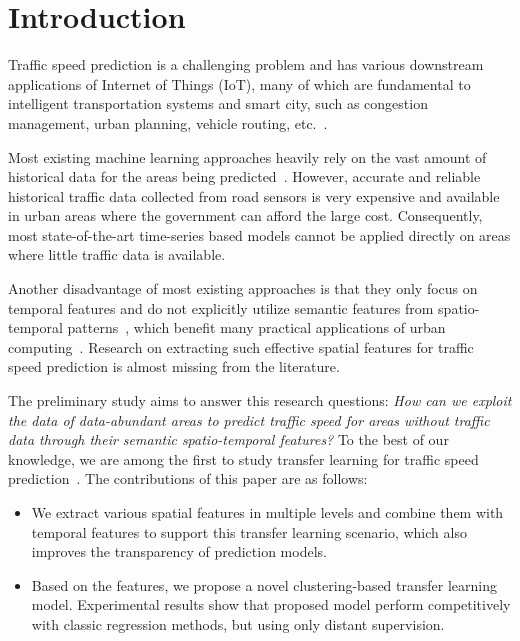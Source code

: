 \section{Introduction}
Traffic speed prediction is a challenging problem and has various downstream applications of Internet of Things (IoT), many of which are fundamental to intelligent transportation systems and smart city, such as
congestion management, urban planning, vehicle routing, etc.~\cite{Pan2012,Xu2015,Mchugh2015}.

Most existing machine learning approaches heavily rely on the vast amount of historical data for the areas being predicted~\cite{Ren2014,Clark2003Traffic}.
However, accurate and reliable historical traffic data collected from road sensors is very expensive and available in urban areas where the government can afford the large cost.
Consequently, most state-of-the-art time-series based models cannot be applied directly on areas where little traffic data is available.

Another disadvantage of most existing approaches is that they only focus on temporal features and do not explicitly utilize semantic features from spatio-temporal patterns~\cite{yao2017short,lin2017road},
which benefit many practical applications of urban computing~\cite{zheng2014urban}.
Research on extracting such effective spatial features for traffic speed prediction is almost missing from the literature. 

The preliminary study aims to answer this research questions:
\textit{{{How can we exploit the data of data-abundant areas to predict traffic speed for areas without traffic data through their semantic spatio-temporal features?}}}
To the best of our knowledge, we are among the first to study transfer learning for traffic speed prediction~\cite{xu2016cross}.
The contributions of this paper are as follows: 
\begin{itemize}
	\item We extract various spatial features in multiple levels and combine them with temporal features to support this transfer learning scenario, which also improves the transparency of prediction models. 
	\item Based on the features, we propose a novel clustering-based transfer learning model. Experimental results show that proposed model perform competitively with classic regression methods, but using only distant supervision.
\end{itemize}

